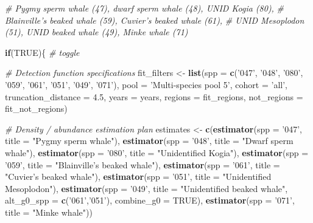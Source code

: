 \documentclass[
]{book}
\newenvironment{Shaded}{\begin{snugshade}}{\end{snugshade}}
\newcommand{\CommentTok}[1]{\textcolor[rgb]{0.56,0.35,0.01}{\textit{#1}}}
\newcommand{\ControlFlowTok}[1]{\textcolor[rgb]{0.13,0.29,0.53}{\textbf{#1}}}
\newcommand{\DataTypeTok}[1]{\textcolor[rgb]{0.13,0.29,0.53}{#1}}
\newcommand{\FloatTok}[1]{\textcolor[rgb]{0.00,0.00,0.81}{#1}}
\newcommand{\KeywordTok}[1]{\textcolor[rgb]{0.13,0.29,0.53}{\textbf{#1}}}
\newcommand{\NormalTok}[1]{#1}
\newcommand{\OtherTok}[1]{\textcolor[rgb]{0.56,0.35,0.01}{#1}}
\newcommand{\StringTok}[1]{\textcolor[rgb]{0.31,0.60,0.02}{#1}}
\begin{document}
\begin{Shaded}
\begin{Highlighting}[]
\CommentTok{# Pygmy sperm whale (47), dwarf sperm whale (48), UNID Kogia (80),}
\CommentTok{# Blainville's beaked whale (59), Cuvier's beaked whale (61),}
\CommentTok{# UNID Mesoplodon (51), UNID beaked whale (49), Minke whale (71)}

\ControlFlowTok{if}\NormalTok{(}\OtherTok{TRUE}\NormalTok{)\{ }\CommentTok{# toggle}

  \CommentTok{# Detection function specifications}
\NormalTok{  fit_filters <-}
\StringTok{    }\KeywordTok{list}\NormalTok{(}\DataTypeTok{spp =} \KeywordTok{c}\NormalTok{(}\StringTok{'047'}\NormalTok{, }\StringTok{'048'}\NormalTok{, }\StringTok{'080'}\NormalTok{, }\StringTok{'059'}\NormalTok{, }\StringTok{'061'}\NormalTok{, }\StringTok{'051'}\NormalTok{, }\StringTok{'049'}\NormalTok{, }\StringTok{'071'}\NormalTok{),}
         \DataTypeTok{pool =} \StringTok{'Multi-species pool 5'}\NormalTok{,}
         \DataTypeTok{cohort =} \StringTok{'all'}\NormalTok{,}
         \DataTypeTok{truncation_distance =} \FloatTok{4.5}\NormalTok{,}
         \DataTypeTok{years =}\NormalTok{ years,}
         \DataTypeTok{regions =}\NormalTok{ fit_regions,}
         \DataTypeTok{not_regions =}\NormalTok{ fit_not_regions)}

  \CommentTok{# Density / abundance estimation plan}
\NormalTok{  estimates <-}
\StringTok{      }\KeywordTok{c}\NormalTok{(}\KeywordTok{estimator}\NormalTok{(}\DataTypeTok{spp =} \StringTok{'047'}\NormalTok{, }\DataTypeTok{title =} \StringTok{"Pygmy sperm whale"}\NormalTok{),}
        \KeywordTok{estimator}\NormalTok{(}\DataTypeTok{spp =} \StringTok{'048'}\NormalTok{, }\DataTypeTok{title =} \StringTok{"Dwarf sperm whale"}\NormalTok{),}
        \KeywordTok{estimator}\NormalTok{(}\DataTypeTok{spp =} \StringTok{'080'}\NormalTok{, }\DataTypeTok{title =} \StringTok{"Unidentified Kogia"}\NormalTok{),}
        \KeywordTok{estimator}\NormalTok{(}\DataTypeTok{spp =} \StringTok{'059'}\NormalTok{, }\DataTypeTok{title =} \StringTok{"Blainville's beaked whale"}\NormalTok{),}
        \KeywordTok{estimator}\NormalTok{(}\DataTypeTok{spp =} \StringTok{'061'}\NormalTok{, }\DataTypeTok{title =} \StringTok{"Cuvier's beaked whale"}\NormalTok{),}
        \KeywordTok{estimator}\NormalTok{(}\DataTypeTok{spp =} \StringTok{'051'}\NormalTok{, }\DataTypeTok{title =} \StringTok{"Unidentified Mesoplodon"}\NormalTok{),}
        \KeywordTok{estimator}\NormalTok{(}\DataTypeTok{spp =} \StringTok{'049'}\NormalTok{, }
                  \DataTypeTok{title =} \StringTok{"Unidentified beaked whale"}\NormalTok{,}
                  \DataTypeTok{alt_g0_spp =} \KeywordTok{c}\NormalTok{(}\StringTok{'061'}\NormalTok{,}\StringTok{'051'}\NormalTok{),}
                  \DataTypeTok{combine_g0 =} \OtherTok{TRUE}\NormalTok{),}
        \KeywordTok{estimator}\NormalTok{(}\DataTypeTok{spp =} \StringTok{'071'}\NormalTok{, }\DataTypeTok{title =} \StringTok{"Minke whale"}\NormalTok{))}


\end{Highlighting}
\end{Shaded}
\end{document}
